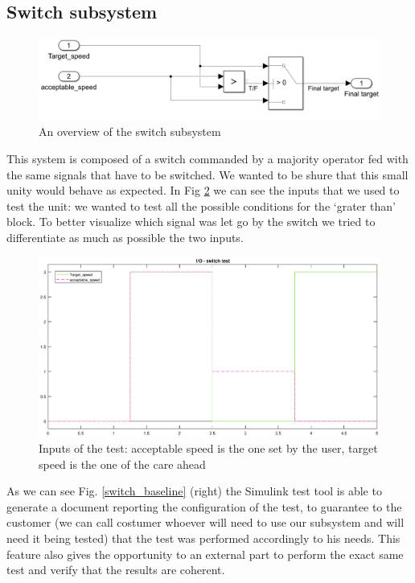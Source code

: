 \documentclass[12pt,a4paper]{report}
\begin{document}
\subsection{Switch subsystem}
\begin{figure}[!h]
	\centering
	\includegraphics[scale=0.34]{switch_subs.jpg}
	\caption{An overview of the switch subsystem}
	\label{switch_subs}
\end{figure}
\FloatBarrier
This system is composed of a switch commanded by a majority operator fed with the same signals that have to be switched. We wanted to be shure that this small unity would behave as expected. 
In Fig \ref{IO_baseline_switch_detach} we can see the inputs that we used to test the unit: we wanted to test all the possible conditions for the ‘grater than’ block. To better visualize which signal was let go by the switch we tried to differentiate as much as possible the two inputs.
\begin{figure}[!h]
	\centering
	\includegraphics[scale=0.4]{IO_baseline_switch_detach.eps}
	\caption{Inputs of the test: acceptable speed is the one set by the user, target speed is the one of the care ahead}
	\label{IO_baseline_switch_detach}
\end{figure}
As we can see Fig. \ref{switch_baseline} (right) the Simulink test tool is able to generate a document reporting the configuration of the test, to guarantee to the customer (we can call costumer whoever will need to use our subsystem and will need it being tested) that the test was performed accordingly to his needs. This feature also gives the opportunity to an external part to perform the exact same test and verify that the results are coherent.
\end{document}
